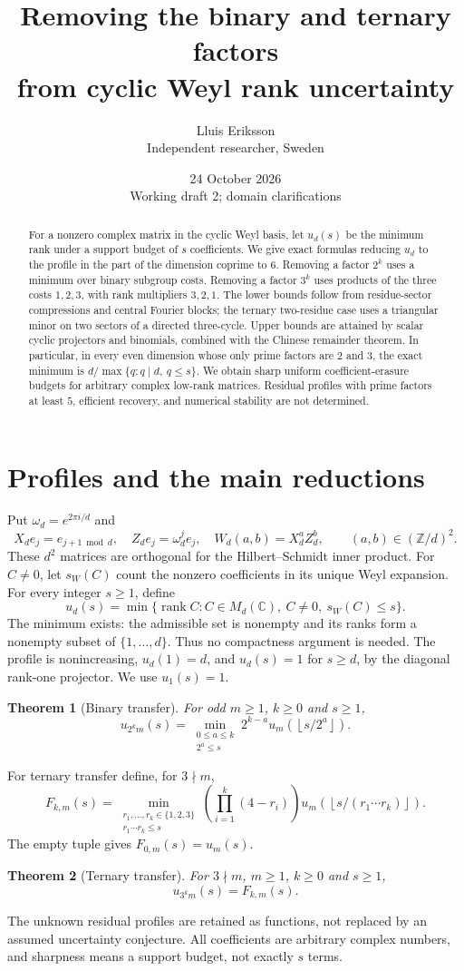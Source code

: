 \documentclass[11pt,a4paper]{article}
\title{Removing the binary and ternary factors\\from cyclic Weyl rank uncertainty}
\author{Lluis Eriksson\\\small Independent researcher, Sweden}
\date{24 October 2026\\Working draft 2; domain clarifications}
\newtheorem{theorem}{Theorem}
\theoremstyle{remark}\newtheorem{remark}[theorem]{Remark}
\DeclareMathOperator{\rank}{rank}
\newcommand{\C}{\mathbb C}\newcommand{\Z}{\mathbb Z}
\newcommand{\fl}[1]{\left\lfloor #1\right\rfloor}
\begin{document}
\maketitle
\begin{abstract}
For a nonzero complex matrix in the cyclic Weyl basis, let $u_d(s)$ be the
minimum rank under a support budget of $s$ coefficients. We give exact
formulas reducing $u_d$ to the profile in the part of the dimension coprime
to $6$. Removing a factor $2^k$ uses a minimum over binary subgroup costs.
Removing a factor $3^k$ uses products of the three costs $1,2,3$, with rank
multipliers $3,2,1$. The lower bounds follow from residue-sector
compressions and central Fourier blocks; the ternary two-residue case uses
a triangular minor on two sectors of a directed three-cycle. Upper bounds
are attained by scalar cyclic projectors and binomials, combined with the
Chinese remainder theorem. In particular, in every even dimension whose
only prime factors are $2$ and $3$, the exact minimum is
$d/\max\{q:q\mid d,\ q\le s\}$. We obtain sharp uniform coefficient-erasure
budgets for arbitrary complex low-rank matrices. Residual profiles with
prime factors at least $5$, efficient recovery, and numerical stability
are not determined.
\end{abstract}

\section{Profiles and the main reductions}
Put $\omega_d=e^{2\pi i/d}$ and
\[
 X_de_j=e_{j+1\bmod d},\quad Z_de_j=\omega_d^je_j,\quad
 W_d(a,b)=X_d^aZ_d^b,\qquad (a,b)\in(\Z/d)^2.
\]
These $d^2$ matrices are orthogonal for the Hilbert--Schmidt inner product.
For $C\ne0$, let $s_W(C)$ count the nonzero coefficients in its unique Weyl
expansion. For every integer $s\ge1$, define
\[
 u_d(s)=\min\{\rank C:C\in M_d(\C),\ C\ne0,\ s_W(C)\le s\}.
\]
The minimum exists: the admissible set is nonempty and its ranks form a
nonempty subset of $\{1,\ldots,d\}$. Thus no compactness argument is needed.
The profile is nonincreasing, $u_d(1)=d$, and $u_d(s)=1$ for $s\ge d$,
by the diagonal rank-one projector. We use $u_1(s)=1$.

\begin{theorem}[Binary transfer]\label{thm:two}
For odd $m\ge1$, $k\ge0$ and $s\ge1$,
\[
 u_{2^km}(s)=
 \min_{\substack{0\le a\le k\\2^a\le s}}
       2^{k-a}u_m\!\left(\fl{s/2^a}\right).
\]
\end{theorem}
For ternary transfer define, for $3\nmid m$,
\[
 F_{k,m}(s)=
 \min_{\substack{r_1,\ldots,r_k\in\{1,2,3\}\\
                  r_1\cdots r_k\le s}}
 \left(\prod_{i=1}^k(4-r_i)\right)
 u_m\!\left(\fl{s/(r_1\cdots r_k)}\right).
\]
The empty tuple gives $F_{0,m}(s)=u_m(s)$.
\begin{theorem}[Ternary transfer]\label{thm:three}
For $3\nmid m$, $m\ge1$, $k\ge0$ and $s\ge1$,
\[
 u_{3^km}(s)=F_{k,m}(s).
\]
\end{theorem}
The unknown residual profiles are retained as functions, not replaced by
an assumed uncertainty conjecture. All coefficients are arbitrary complex
numbers, and sharpness means a support budget, not exactly $s$ terms.
\end{document}
